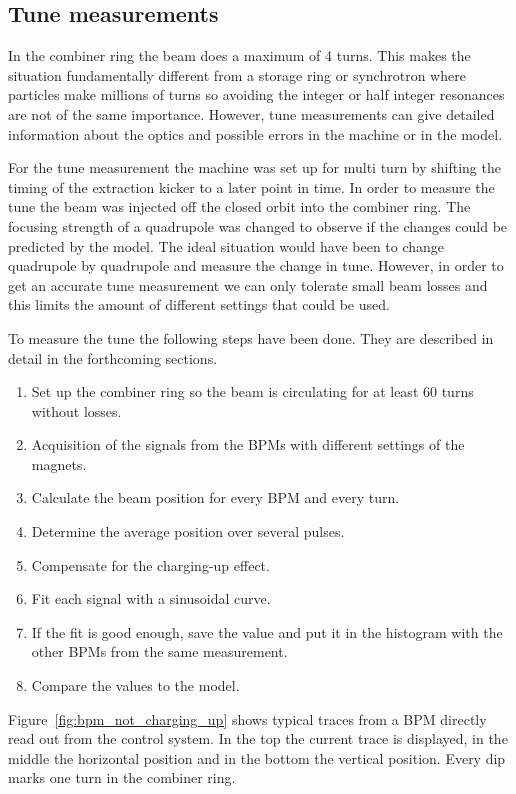 \subsection{Tune measurements}

In the combiner ring the beam does a maximum of 4 turns. 
This makes the situation fundamentally different from a storage ring or 
synchrotron where particles make millions of turns so avoiding the integer or 
half integer resonances are not of the same importance. 
However, tune measurements can give detailed information about the optics and 
possible errors in the machine or in the model.

For the tune measurement the machine was set up for multi turn by shifting 
the timing of the extraction kicker to a later point in time. 
In order to measure the tune the beam was injected 
off the closed orbit into the combiner ring. 
The focusing strength of a quadrupole was changed to observe 
if the changes could be predicted by the model. 
The ideal situation would have been to change quadrupole by 
quadrupole and measure the change in tune.
However, in order to get an accurate tune measurement 
we can only tolerate small beam losses and 
this limits the amount of different settings that could be used.


To measure the tune the following steps have been done. 
They are described in detail in the forthcoming sections.
\begin{enumerate}
\item
Set up the combiner ring so the beam is circulating for at least 60 turns 
without losses.
\item
Acquisition of the signals from the BPMs with different settings of the magnets.
\item
Calculate the beam position for every BPM and every turn.
\item
Determine the average position over several pulses.
\item
Compensate for the charging-up effect.
\item
Fit each signal with a sinusoidal curve.
\item
If the fit is good enough, save the value and put it in the histogram with 
the other BPMs from the same measurement.
\item
Compare the values to the model.
\end{enumerate}


 
Figure~\ref{fig:bpm_not_charging_up} shows typical traces from a BPM directly read out 
from the control system. In the top the current trace is displayed, 
in the middle the horizontal position and in the bottom the vertical position. 
Every dip marks one turn in the combiner ring. 

